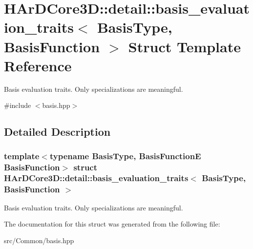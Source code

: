 \hypertarget{structHArDCore3D_1_1detail_1_1basis__evaluation__traits}{}\section{H\+Ar\+D\+Core3D\+:\+:detail\+:\+:basis\+\_\+evaluation\+\_\+traits$<$ Basis\+Type, Basis\+Function $>$ Struct Template Reference}
\label{structHArDCore3D_1_1detail_1_1basis__evaluation__traits}


Basis evaluation traits. Only specializations are meaningful.  




{\ttfamily \#include $<$basis.\+hpp$>$}



\subsection{Detailed Description}
\subsubsection*{template$<$typename Basis\+Type, Basis\+FunctionE Basis\+Function$>$\newline
struct H\+Ar\+D\+Core3\+D\+::detail\+::basis\+\_\+evaluation\+\_\+traits$<$ Basis\+Type, Basis\+Function $>$}

Basis evaluation traits. Only specializations are meaningful. 

The documentation for this struct was generated from the following file\+:\begin{DoxyCompactItemize}
\item 
src/\+Common/basis.\+hpp\end{DoxyCompactItemize}
